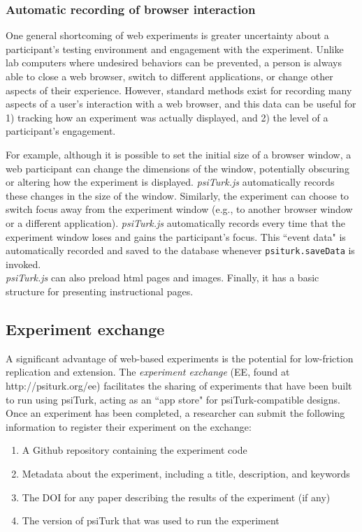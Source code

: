 \documentclass[twocolumn]{svjour3}          %
\begin{document}
\subsubsection{Automatic recording of browser interaction}
 
One general shortcoming of web experiments is greater uncertainty about a participant's testing environment and engagement with the experiment.
Unlike lab computers where undesired behaviors can be prevented, a person is always able to close a web browser, switch to different applications, or change other aspects of their experience.
However, standard methods exist for recording many aspects of a user's interaction with a web browser, and this data can be useful for 1) tracking how an experiment was actually displayed, and 2) the level of a participant's engagement.

For example, although it is possible to set the initial size of a browser window, a web participant can change the dimensions of the window, potentially obscuring or altering how the experiment is displayed.
\emph{psiTurk.js} automatically records these changes in the size of the window.
Similarly, the experiment can choose to switch focus away from the experiment window (e.g., to another browser window or a different application).
\emph{psiTurk.js} automatically records every time that the experiment window loses and gains the participant's focus.
This ``event data" is automatically recorded and saved to the database whenever \texttt{psiturk.saveData} is invoked. \\


\emph{psiTurk.js} can also preload html pages and images.
Finally, it has a basic structure for presenting instructional pages.

\subsection{Experiment exchange}

A significant advantage of web-based experiments is the potential for low-friction replication and extension. 
The \emph{experiment exchange} (EE, found at http://psiturk.org/ee) facilitates the sharing of experiments that have been built to run using psiTurk, acting as an ``app store" for psiTurk-compatible designs.
Once an experiment has been completed, a researcher can submit the following information to register their experiment on the exchange:

\begin{enumerate}
\item A Github repository containing the experiment code
\item Metadata about the experiment, including a title, description, and keywords
\item The DOI for any paper describing the results of the experiment (if any)
\item The version of psiTurk that was used to run the experiment
\end{enumerate}
\end{document}
